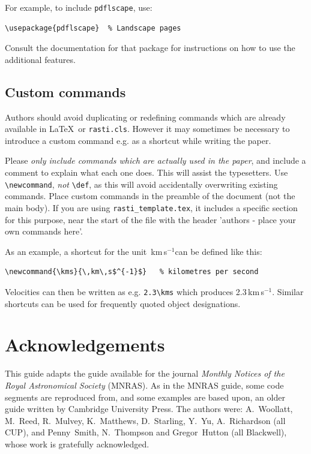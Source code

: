 \documentclass[fleqn,usenatbib,useAMS]{rasti}
\newcommand{\kms}{\,km\,s$^{-1}$} %
\begin{document}
For example, to include \verb'pdflscape', use:
\begin{verbatim}
\usepackage{pdflscape}	% Landscape pages
\end{verbatim}
Consult the documentation for that package for instructions on how to use the additional features.


\subsection{Custom commands}

Authors should avoid duplicating or redefining commands which are already available in \LaTeX\ or \verb'rasti.cls'.
However it may sometimes be necessary to introduce a custom command e.g. as a shortcut while writing the paper.

Please \emph{only include commands which are actually used in the paper}, and include a comment to explain what each one does.
This will assist the typesetters.
Use \verb'\newcommand', \emph{not} \verb'\def', as this will avoid accidentally overwriting existing commands.
Place custom commands in the preamble of the document (not the main body).
If you are using \texttt{rasti\_template.tex}, it includes a specific section for this purpose, near the start of the file with the header 'authors - place your own commands here'.

As an example, a shortcut for the unit \kms can be defined like this:
\begin{verbatim}
\newcommand{\kms}{\,km\,s$^{-1}$}	% kilometres per second
\end{verbatim}
Velocities can then be written as e.g. \verb'2.3\kms' which produces 2.3\kms.
Similar shortcuts can be used for frequently quoted object designations.


\section*{Acknowledgements}

This guide adapts the guide available for the journal \textit{Monthly Notices of the Royal Astronomical Society} (MNRAS).
As in the MNRAS guide, some code segments are reproduced from, and some examples are based upon, an older guide written by Cambridge University Press.
The authors were: A.~Woollatt, M.~Reed, R.~Mulvey, K.~Matthews, D.~Starling, Y.~Yu, A.~Richardson (all CUP), and Penny~Smith, N.~Thompson and Gregor~Hutton (all Blackwell), whose work is gratefully acknowledged.
\end{document}
